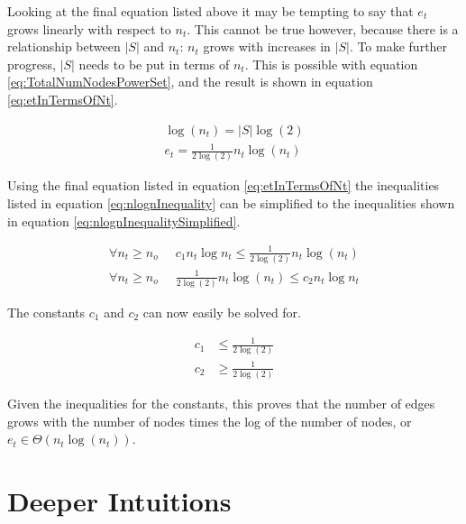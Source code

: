 \documentclass{article}
\begin{document}
Looking at the final equation listed above it may be tempting to say that $e_t$ grows linearly with respect to $n_t$. This cannot be true however, because there is a relationship between $|S|$ and $n_t$: $n_t$ grows with increases in $|S|$. To make further progress, $|S|$ needs to be put in terms of $n_t$. This is possible with equation \ref{eq:TotalNumNodesPowerSet}, and the result is shown in equation \ref{eq:etInTermsOfNt}.

\begin{equation}
    \begin{split}
        \log(n_t)=|S|\log(2) \\
        e_t=\frac{1}{2\log(2)}n_t\log(n_t)
    \end{split}
    \label{eq:etInTermsOfNt}
\end{equation}

Using the final equation listed in equation \ref{eq:etInTermsOfNt} the inequalities listed in equation \ref{eq:nlognInequality} can be simplified to the inequalities shown in equation \ref{eq:nlognInequalitySimplified}.

\begin{equation}
    \begin{split}
        \forall n_t\ge n_o \;\; &
        c_1 n_t \log n_t \le \frac{1}{2\log(2)}n_t\log(n_t)
        \\
        \forall n_t\ge n_o \;\; &
        \frac{1}{2\log(2)}n_t\log(n_t) \le c_2 n_t \log n_t
    \end{split}
    \label{eq:nlognInequalitySimplified}
\end{equation}

The constants $c_1$ and $c_2$ can now easily be solved for.

\begin{equation}
    \begin{split}
        c_1 &\le \frac{1}{2\log(2)}
        \\
        c_2 &\ge \frac{1}{2\log(2)}
    \end{split}
\end{equation}

Given the inequalities for the constants, this proves that the number of edges grows with the number of nodes times the log of the number of nodes, or $e_t\in \Theta(n_t\log(n_t))$.

\section{Deeper Intuitions}
\label{sec:DeeperIntuitions}
\end{document}
